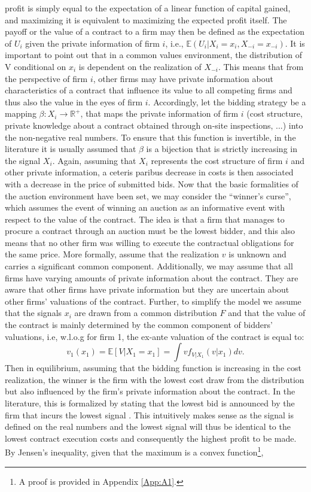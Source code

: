 \documentclass[a4paper,12pt, headsepline]{scrartcl}
\numberwithin{equation}{section}
\begin{document}
profit is simply equal to the expectation of a linear function of capital gained, and maximizing it is equivalent to maximizing the expected profit itself. The payoff or the value of a contract to a firm may then be defined as the expectation of $U_i$ given the private information of firm $i$, i.e., $\mathbb{E}(U_i|X_i = x_i, X_{-i} = x_{-i})$. It is important to point out that in a common values environment, the distribution of V conditional on $x_{i}$ is dependent on the realization of $X_{-i}$. This means that from the perspective of firm $i$, other firms may have private information about characteristics of a contract that influence its value to all competing firms and thus also the value in the eyes of firm $i$. Accordingly, let the bidding strategy be a mapping $\beta: X_i \rightarrow \mathbb{R}^+$, that maps the private information of firm $i$ (cost structure, private knowledge about a contract obtained through on-site inspections, ...) into the non-negative real numbers. To ensure that this function is invertible, in the literature it is usually assumed that $\beta$ is a bijection that is strictly increasing in the signal $X_i$. Again, assuming that $X_i$ represents the cost structure of firm $i$ and other private information, a ceteris paribus decrease in costs is then associated with a decrease in the price of submitted bids. Now that the basic formalities of the auction environment have been set, we may consider the \enquote{winner's curse}, which assumes the event of winning an auction as an informative event with respect to the value of the contract. The idea is that a firm that manages to procure a contract through an auction must be the lowest bidder, and this also means that no other firm was willing to execute the contractual obligations for the same price. More formally, assume that the realization $v$ is unknown and carries a significant common component. Additionally, we may assume that all firms have varying amounts of private information about the contract. They are aware that other firms have private information but they are uncertain about other firms' valuations of the contract. Further, to simplify the model we assume that the signals $x_i$ are drawn from a common distribution $F$ and that the value of the contract is mainly determined by the common component of bidders' valuations, i.e, w.l.o.g for firm 1, the ex-ante valuation of the contract is equal to:
\[
v_1(x_1) = \mathbb{E}[V|X_1 = x_1]  = \int vf_{V|X_1}(v|x_1)dv.
\]
Then in equilibrium, assuming that the bidding function is increasing in the cost realization, the winner is the firm with the lowest cost draw from the distribution but also influenced by the firm's private information about the contract. In the literature, this is formalized by stating that the lowest bid is announced by the firm that incurs the lowest signal \citep{HandbookIndustrialOrga}. This intuitively makes sense as the signal is defined on the real numbers and the lowest signal will thus be identical to the lowest contract execution costs and consequently the highest profit to be made. By Jensen's inequality, given that the maximum is a convex function\footnote{A proof is provided in Appendix \ref{App:A1}.}, 
\end{document}
